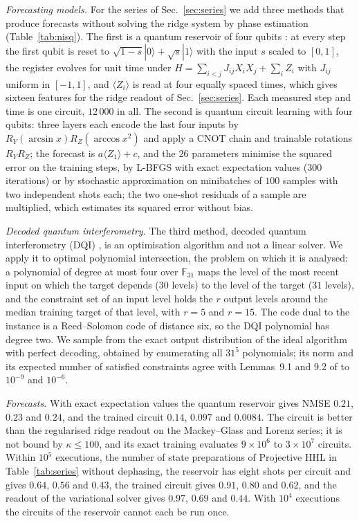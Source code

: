 \documentclass[journal]{IEEEtran}
\begin{document}
\emph{Forecasting models.} For the series of Sec.~\ref{sec:series} we add three methods that produce forecasts without solving the ridge system by phase estimation (Table~\ref{tab:nisq}). The first is a quantum reservoir of four qubits \cite{Fujii2017}: at every step the first qubit is reset to $\sqrt{1-s}|0\rangle+\sqrt s|1\rangle$ with the input $s$ scaled to $[0,1]$, the register evolves for unit time under $H=\sum_{i<j}J_{ij}X_iX_j+\sum_iZ_i$ with $J_{ij}$ uniform in $[-1,1]$, and $\langle Z_i\rangle$ is read at four equally spaced times, which gives sixteen features for the ridge readout of Sec.~\ref{sec:series}. Each measured step and time is one circuit, $12\,000$ in all. The second is quantum circuit learning \cite{Mitarai2018} with four qubits: three layers each encode the last four inputs by $R_Y(\arcsin x)R_Z(\arccos x^2)$ and apply a CNOT chain and trainable rotations $R_YR_Z$; the forecast is $a\langle Z_1\rangle+c$, and the $26$ parameters minimise the squared error on the training steps, by L-BFGS with exact expectation values ($300$ iterations) or by stochastic approximation on minibatches of $100$ samples with two independent shots each; the two one-shot residuals of a sample are multiplied, which estimates its squared error without bias.

\emph{Decoded quantum interferometry.} The third method, decoded quantum interferometry (DQI) \cite{Jordan2025}, is an optimisation algorithm and not a linear solver. We apply it to optimal polynomial intersection, the problem on which it is analysed: a polynomial of degree at most four over $\mathbb F_{31}$ maps the level of the most recent input on which the target depends ($30$ levels) to the level of the target ($31$ levels), and the constraint set of an input level holds the $r$ output levels around the median training target of that level, with $r=5$ and $r=15$. The code dual to the instance is a Reed--Solomon code of distance six, so the DQI polynomial has degree two. We sample from the exact output distribution of the ideal algorithm with perfect decoding, obtained by enumerating all $31^5$ polynomials; its norm and its expected number of satisfied constraints agree with Lemmas~9.1 and 9.2 of \cite{Jordan2025} to $10^{-9}$ and $10^{-6}$.

\emph{Forecasts.} With exact expectation values the quantum reservoir gives NMSE $0.21$, $0.23$ and $0.24$, and the trained circuit $0.14$, $0.097$ and $0.0084$. The circuit is better than the regularised ridge readout on the Mackey--Glass and Lorenz series; it is not bound by $\kappa\le100$, and its exact training evaluates $9\times10^6$ to $3\times10^7$ circuits. Within $10^5$ executions, the number of state preparations of Projective HHL in Table~\ref{tab:series} without dephasing, the reservoir has eight shots per circuit and gives $0.64$, $0.56$ and $0.43$, the trained circuit gives $0.91$, $0.80$ and $0.62$, and the readout of the variational solver gives $0.97$, $0.69$ and $0.44$. With $10^4$ executions the circuits of the reservoir cannot each be run once.
\end{document}
